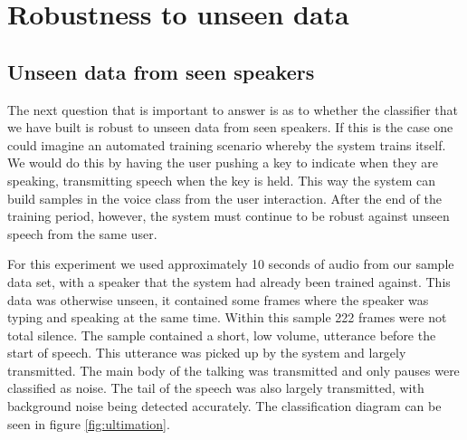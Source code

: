 \documentclass[ %
                    author={Sam Phippen},
                supervisor={Dr. Rafal Bogacz},
                     title={Real time voice activity detectors in noisy personal computing environments},
                  subtitle={},
                    degree={MEng},
                      year={2012} ]{thesis}
\begin{document}
\section {Robustness to unseen data}

\subsection{Unseen data from seen speakers}

The next question that is important to answer is as to whether the classifier
that we have built is robust to unseen data from seen speakers. If this is the
case one could imagine an automated training scenario whereby the system trains
itself. We would do this by having the user pushing a key to indicate when they
are speaking, transmitting speech when the key is held. This way the system can
build samples in the voice class from the user interaction. After the end of
the training period, however, the system must continue to be robust against
unseen speech from the same user.

For this experiment we used approximately 10 seconds of audio from our sample
data set, with a speaker that the system had already been trained against. This
data was otherwise unseen, it contained some frames where the speaker was
typing and speaking at the same time. Within this sample 222 frames were not
total silence. The sample contained a short, low volume, utterance before the
start of speech. This utterance was picked up by the system and largely
transmitted. The main body of the talking was transmitted and only pauses were
classified as noise. The tail of the speech was also largely transmitted, with
background noise being detected accurately. The classification diagram can be
seen in figure \ref{fig:ultimation}.
\end{document}
